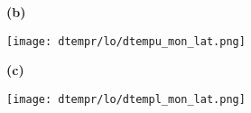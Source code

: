 \documentclass[preview]{standalone}
\begin{document}
\begin{figure}
  \begin{subfigure}[t]{0.05\textwidth}
    \textbf{\large{(b)}}
  \end{subfigure}
  \begin{subfigure}[t]{0.95\textwidth}
    \texttt{[image: dtempr/lo/dtempu\_mon\_lat.png]}
  \end{subfigure}

  \begin{subfigure}[t]{0.05\textwidth}
    \textbf{\large{(c)}}
  \end{subfigure}
  \begin{subfigure}[t]{0.95\textwidth}
    \texttt{[image: dtempr/lo/dtempl\_mon\_lat.png]}
  \end{subfigure}


\end{figure}
\end{document}
